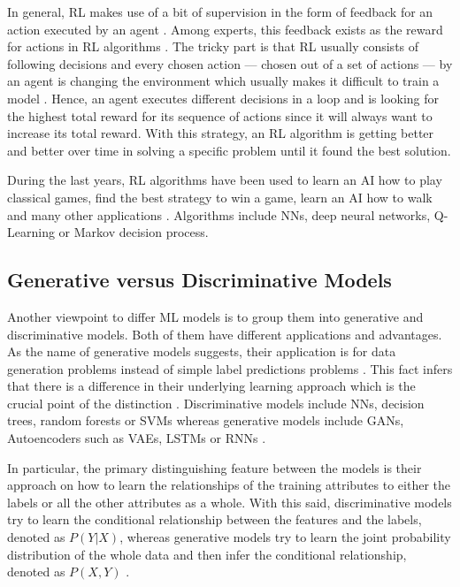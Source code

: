 \documentclass[MGS,Master,english]{twbook}%
\begin{document}
In general, RL makes use of a bit of supervision in the form of feedback for an action executed by an agent \cite{ml::book::statistics}. Among experts, this feedback exists as the reward for actions in RL algorithms \cite{ml::book::statistics}.  The tricky part is that RL usually consists of following decisions and every chosen action — chosen out of a set of actions — by an agent is changing the environment which usually makes it difficult to train a model \cite{ml::book::statistics}. Hence, an agent executes different decisions in a loop and is looking for the highest total reward for its sequence of actions since it will always want to increase its total reward. \cite{ai::book} With this strategy, an RL algorithm is getting better and better over time in solving a specific problem until it found the best solution.

During the last years, RL algorithms have been used to learn an AI how to play classical games, find the best strategy to win a game, learn an AI how to walk and many other applications \cite{ml::book::algorithms}. Algorithms include \acp{NN}, deep neural networks, Q-Learning or Markov decision process. \cite{ml::book::statistics}

\subsection{Generative versus Discriminative Models}
Another viewpoint to differ ML models is to group them into generative and discriminative models. Both of them have different applications and advantages. As the name of generative models suggests, their application is for data generation problems instead of simple label predictions problems \cite{ml::book::nnProgrammingTF}. This fact infers that there is a difference in their underlying learning approach which is the crucial point of the distinction \cite{ml::book::nnProgrammingTF}. Discriminative models include \acp{NN}, decision trees, random forests or \acp{SVM} whereas generative models include \acp{GAN}, Autoencoders such as \acp{VAE}, \acp{LSTM} or \acp{RNN} \cite{ml::book::nnProgrammingTF}. 

In particular, the primary distinguishing feature between the models is their approach on how to learn the relationships of the training attributes to either the labels or all the other attributes as a whole. With this said, discriminative models try to learn the conditional relationship between the features and the labels, denoted as $P(Y|X)$, whereas generative models try to learn the joint probability distribution of the whole data and then infer the conditional relationship, denoted as $P(X,Y)$ \cite{ml::book::nnProgrammingTF}.
\end{document}
